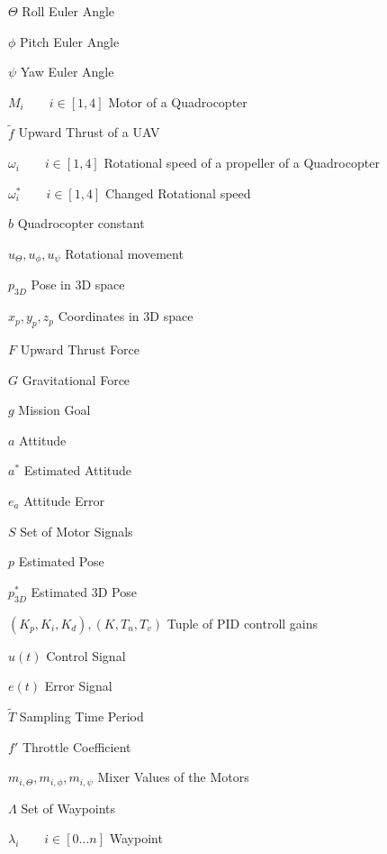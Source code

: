 \documentclass[bachelor,english]{infothesis}
\begin{document}
\begin{description}
	\item $\Theta$ \dotfill Roll Euler Angle
	\item $\phi$  \dotfill Pitch Euler Angle
	\item $\psi$ \dotfill Yaw Euler Angle
	\item $M_i \qquad i \in [1,4]$ \dotfill Motor of a Quadrocopter
	\item $\tilde{f}$ \dotfill Upward Thrust of a UAV
	\item $\omega_i \qquad i \in [1,4]$ \dotfill  Rotational speed of a propeller of a Quadrocopter
	\item $\omega_i^* \qquad i \in [1,4]$ \dotfill Changed Rotational speed 
	\item $b$ \dotfill Quadrocopter constant
	\item $u_{\Theta}, u_{\phi}, u_{\psi}$ \dotfill Rotational movement
	\item $p_{3D}$ \dotfill Pose in 3D space
	\item $x_p, y_p, z_p$ \dotfill Coordinates in 3D space
	\item $F$ \dotfill Upward Thrust Force
	\item $G$ \dotfill Gravitational Force
	\\
	\item $g$ \dotfill Mission Goal
	\item $a$ \dotfill Attitude
	\item $a^*$ \dotfill Estimated Attitude
	\item $e_a$ \dotfill Attitude Error
	\item $S$ \dotfill Set of Motor Signals
	\item $p$ \dotfill Estimated Pose
	\item $p_{3D}^*$ \dotfill Estimated 3D Pose
	\item $(K_p, K_i, K_d), (K, T_n, T_v)$  \dotfill Tuple of PID controll gains
	\item $u(t)$ \dotfill Control Signal
	\item $e(t)$ \dotfill Error Signal
	\item $\tilde{T}$ \dotfill Sampling Time Period
	\item $f'$ \dotfill Throttle Coefficient
	\item $m_{i,\Theta} , m_{i, \phi}, m_{i, \psi}$ \dotfill Mixer Values of the Motors
	\item $\Lambda$ \dotfill Set of Waypoints
	\item $\lambda_i \qquad i \in [0...n]$ \dotfill Waypoint

\end{description}
\end{document}
